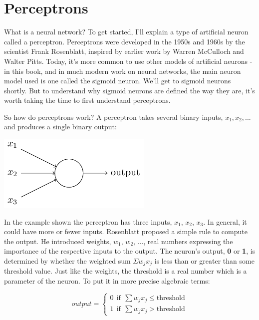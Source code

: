 \documentclass[a4paper,12pt]{report}%
\begin{document}
\section{Perceptrons}
What is a neural network? To get started, I'll explain a type of artificial neuron called a perceptron. Perceptrons were developed in the 1950s and 1960s by the scientist Frank Rosenblatt, inspired by earlier work by Warren McCulloch and Walter Pitts. Today, it's more common to use other models of artificial neurons - in this book, and in much modern work on neural networks, the main neuron model used is one called the sigmoid neuron. We'll get to sigmoid neurons shortly. But to understand why sigmoid neurons are defined the way they are, it's worth taking the time to first understand perceptrons.

So how do perceptrons work? A perceptron takes several binary inputs, $x_{1}, x_{2}, ... $ and produces a single binary output:

\begin{center}
 \includegraphics[width=0.7\linewidth]{images/tikz0.png}
\end{center}

In the example shown the perceptron has three inputs, $x_{1}$, $x_{2}$, $ x_{3}$. In general, it could have more or fewer inputs. Rosenblatt proposed a simple rule to compute the output. He introduced weights, $w_{1}$, $w_{2}$, ...,  real numbers expressing the importance of the respective inputs to the output. The neuron's output, {\bf 0} or {\bf 1}, is determined by whether the weighted sum $\Sigma w_{j} x_{j}$ is less than or greater than some threshold value. Just like the weights, the threshold is a real number which is a parameter of the neuron. To put it in more precise algebraic terms:

\begin{center}
 \begin{equation}
  output    =   \begin{cases}
                0 ~~ \text{if} ~~ \sum w_{j} x_{j} \le \text{threshold} \\
                1 ~~ \text{if} ~~ \sum w_{j} x_{j}  >  \text{threshold}
                \end{cases}
 \end{equation}
\end{center}
\end{document}
